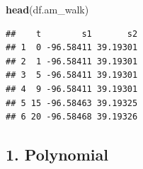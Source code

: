 \documentclass[
]{book}
\newenvironment{Shaded}{\begin{snugshade}}{\end{snugshade}}
\newcommand{\AttributeTok}[1]{\textcolor[rgb]{0.13,0.29,0.53}{#1}}
\newcommand{\CommentTok}[1]{\textcolor[rgb]{0.56,0.35,0.01}{\textit{#1}}}
\newcommand{\DecValTok}[1]{\textcolor[rgb]{0.00,0.00,0.81}{#1}}
\newcommand{\FunctionTok}[1]{\textcolor[rgb]{0.13,0.29,0.53}{\textbf{#1}}}
\newcommand{\NormalTok}[1]{#1}
\newcommand{\OtherTok}[1]{\textcolor[rgb]{0.56,0.35,0.01}{#1}}
\newcommand{\SpecialCharTok}[1]{\textcolor[rgb]{0.81,0.36,0.00}{\textbf{#1}}}
\begin{document}
\begin{Shaded}
\end{Shaded}

\begin{Shaded}
\begin{Highlighting}[]
\FunctionTok{head}\NormalTok{(df.am\_walk)}
\end{Highlighting}
\end{Shaded}

\begin{verbatim}
##    t        s1       s2
## 1  0 -96.58411 39.19301
## 2  1 -96.58411 39.19301
## 3  5 -96.58411 39.19301
## 4  9 -96.58411 39.19301
## 5 15 -96.58463 39.19325
## 6 20 -96.58468 39.19326
\end{verbatim}

\hypertarget{polynomial}{%
\subsection{1. Polynomial}\label{polynomial}}
\end{document}
